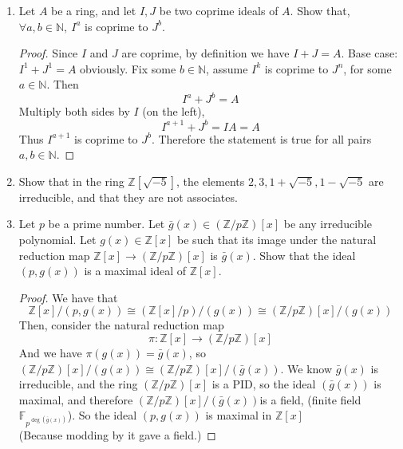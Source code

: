 \documentclass[hidelinks,12pt]{article}
\newcommand{\N}{\mathbb{N}}
\newcommand{\Z}{\mathbb{Z}}
\newcommand{\F}{\mathbb{F}}
\begin{document}
\begin{enumerate}
\begin{proof}
            \[
                k=a+b\cdot \frac{2+i}{5}=a+\frac{2b}{5}+\frac{bi}{5}
            \]
            for some \(a,b\in\Z\). Since \(k=\frac{p}{q}\) is strictly real, we must have
            \[
                \frac{bi}{5}=0\implies b=0
            \]
             But then \(k=a+0\in\Z\) contradiction.\\
            Similarly, write \(k=a+b\cdot \frac{2-i}{5}=a+\frac{2b}{5}-\frac{bi}{5}\) so \(\frac{bi}{5}=0\implies b=0\) so \(k\in\Z\).
        \end{proof}
    \item Let \(A\) be a ring, and let \(I,J\) be two coprime ideals of \(A\). Show that, \(\forall a,b\in\N,\ I^{a}\) is coprime to \(J^{b}\).
        \begin{proof}
            Since \(I\) and \(J\) are coprime, by definition we have \(I+J=A\). Base case: \(I^{1}+J^{1}=A\) obviously. Fix some \(b\in\N\), assume \(I^{k}\) is coprime to \(J^{n}\), for some \(a\in\N\). Then
            \[
                I^{a}+J^{b}=A
            \]
            Multiply both sides by \(I\) (on the left), \[
            I^{a+1}+J^{b}=IA=A
            \]
            Thus \(I^{a+1}\) is coprime to \(J^{b}\). Therefore the statement is true for all pairs \(a,b\in\N\).
        \end{proof}
    \item Show that in the ring \(\Z[\sqrt{-5}]\), the elements \(2,3,1+\sqrt{-5},1-\sqrt{-5}\) are irreducible, and that they are not associates.
    \item Let \(p\) be a prime number. Let \(\bar{g}(x)\in(\Z/p\Z)[x]\) be any irreducible polynomial. Let \(g(x)\in\Z[x]\) be such that its image under the natural reduction map \(\Z[x]\to(\Z/p\Z)[x]\) is \(\bar{g}(x)\). Show that the ideal \((p,g(x))\) is a maximal ideal of \(\Z[x]\).
        \begin{proof}
            We have that \[
                \Z[x]/(p,g(x))\cong(\Z[x]/p)/(g(x))\cong(\Z/p\Z)[x]/(g(x))
            \]
            Then, consider the natural reduction map
            \[
                \pi:\Z[x]\to(\Z/p\Z)[x]
            \]
            And we have \(\pi(g(x))=\bar{g}(x)\), so \((\Z/p\Z)[x]/(g(x))\cong(\Z/p\Z)[x]/(\bar{g}(x))\). We know \(\bar{g}(x)\) is irreducible, and the ring \((\Z/p\Z)[x]\) is a PID, so the ideal \((\bar{g}(x))\) is maximal, and therefore \((\Z/p\Z)[x]/(\bar{g}(x))\)is a field, (finite field \(\F_{p^{\deg(\bar{g}(x))}}\)). So the ideal \((p,g(x))\) is maximal in \(\Z[x]\)\\
            (Because modding by it gave a field.)

\end{proof}
\end{enumerate}
\end{document}
